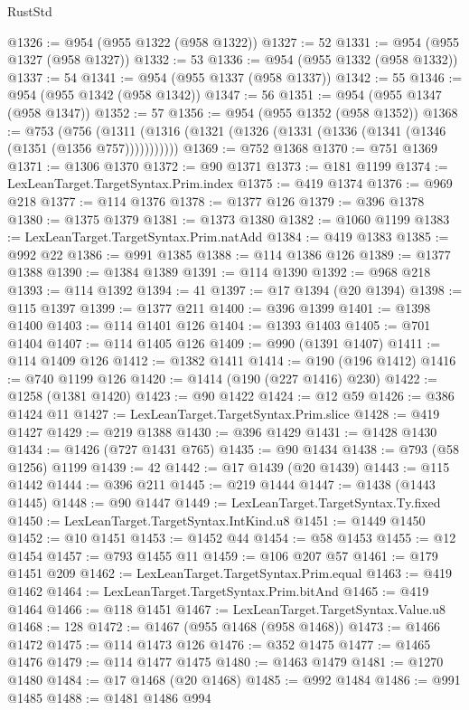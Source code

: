 \begin{lexlean}{RustStd}
\begin{coremodule}
{\begin{coremodule}
{{{{{{{{{{{{{{{{{{{{{{{{{{{{{{{{{{{{{{{{{{{{{{{{{{@1326 := @954 (@955 @1322 (@958 @1322))
@1327 := 52
@1331 := @954 (@955 @1327 (@958 @1327))
@1332 := 53
@1336 := @954 (@955 @1332 (@958 @1332))
@1337 := 54
@1341 := @954 (@955 @1337 (@958 @1337))
@1342 := 55
@1346 := @954 (@955 @1342 (@958 @1342))
@1347 := 56
@1351 := @954 (@955 @1347 (@958 @1347))
@1352 := 57
@1356 := @954 (@955 @1352 (@958 @1352))
@1368 := @753
    (@756 (@1311 (@1316 (@1321 (@1326 (@1331 (@1336 (@1341 (@1346 (@1351 (@1356 @757)))))))))))
@1369 := @752 @1368
@1370 := @751 @1369
@1371 := @1306 @1370
@1372 := @90 @1371
@1373 := @181 @1199
@1374 := LexLeanTarget.TargetSyntax.Prim.index
@1375 := @419 @1374
@1376 := @969 @218
@1377 := @114 @1376
@1378 := @1377 @126
@1379 := @396 @1378
@1380 := @1375 @1379
@1381 := @1373 @1380
@1382 := @1060 @1199
@1383 := LexLeanTarget.TargetSyntax.Prim.natAdd
@1384 := @419 @1383
@1385 := @992 @22
@1386 := @991 @1385
@1388 := @114 @1386 @126
@1389 := @1377 @1388
@1390 := @1384 @1389
@1391 := @114 @1390
@1392 := @968 @218
@1393 := @114 @1392
@1394 := 41
@1397 := @17 @1394 (@20 @1394)
@1398 := @115 @1397
@1399 := @1377 @211
@1400 := @396 @1399
@1401 := @1398 @1400
@1403 := @114 @1401 @126
@1404 := @1393 @1403
@1405 := @701 @1404
@1407 := @114 @1405 @126
@1409 := @990 (@1391 @1407)
@1411 := @114 @1409 @126
@1412 := @1382 @1411
@1414 := @190 (@196 @1412)
@1416 := @740 @1199 @126
@1420 := @1414 (@190 (@227 @1416) @230)
@1422 := @1258 (@1381 @1420)
@1423 := @90 @1422
@1424 := @12 @59
@1426 := @386 @1424 @11
@1427 := LexLeanTarget.TargetSyntax.Prim.slice
@1428 := @419 @1427
@1429 := @219 @1388
@1430 := @396 @1429
@1431 := @1428 @1430
@1434 := @1426 (@727 @1431 @765)
@1435 := @90 @1434
@1438 := @793 (@58 @1256) @1199
@1439 := 42
@1442 := @17 @1439 (@20 @1439)
@1443 := @115 @1442
@1444 := @396 @211
@1445 := @219 @1444
@1447 := @1438 (@1443 @1445)
@1448 := @90 @1447
@1449 := LexLeanTarget.TargetSyntax.Ty.fixed
@1450 := LexLeanTarget.TargetSyntax.IntKind.u8
@1451 := @1449 @1450
@1452 := @10 @1451
@1453 := @1452 @44
@1454 := @58 @1453
@1455 := @12 @1454
@1457 := @793 @1455 @11
@1459 := @106 @207 @57
@1461 := @179 @1451 @209
@1462 := LexLeanTarget.TargetSyntax.Prim.equal
@1463 := @419 @1462
@1464 := LexLeanTarget.TargetSyntax.Prim.bitAnd
@1465 := @419 @1464
@1466 := @118 @1451
@1467 := LexLeanTarget.TargetSyntax.Value.u8
@1468 := 128
@1472 := @1467 (@955 @1468 (@958 @1468))
@1473 := @1466 @1472
@1475 := @114 @1473 @126
@1476 := @352 @1475
@1477 := @1465 @1476
@1479 := @114 @1477 @1475
@1480 := @1463 @1479
@1481 := @1270 @1480
@1484 := @17 @1468 (@20 @1468)
@1485 := @992 @1484
@1486 := @991 @1485
@1488 := @1481 @1486 @994
}}}}}}}}}}}}}}}}}}}}}}}}}}}}}}}}}}}}}}}}}}}}}}}}}}
\end{coremodule}}
\end{coremodule}
\end{lexlean}
